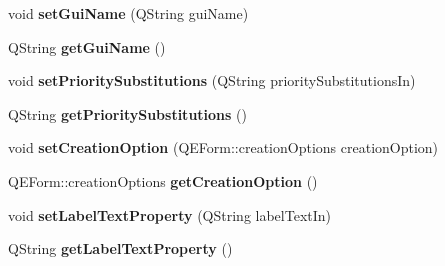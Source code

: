 \begin{DoxyCompactItemize}
\item 
\hypertarget{classQEGenericButton_a5d5e32f2ab10703aa31cd321e90c39f0}{
void {\bfseries setGuiName} (QString guiName)}
\label{classQEGenericButton_a5d5e32f2ab10703aa31cd321e90c39f0}

\item 
\hypertarget{classQEGenericButton_a403f79f9e7159277263e48b73f7cca7a}{
QString {\bfseries getGuiName} ()}
\label{classQEGenericButton_a403f79f9e7159277263e48b73f7cca7a}

\item 
\hypertarget{classQEGenericButton_a30e30457e63dc866da487258064e02c1}{
void {\bfseries setPrioritySubstitutions} (QString prioritySubstitutionsIn)}
\label{classQEGenericButton_a30e30457e63dc866da487258064e02c1}

\item 
\hypertarget{classQEGenericButton_adac082d484c513232c82274947e8b623}{
QString {\bfseries getPrioritySubstitutions} ()}
\label{classQEGenericButton_adac082d484c513232c82274947e8b623}

\item 
\hypertarget{classQEGenericButton_a3640442dd5a6f07b3cac78a16d92079c}{
void {\bfseries setCreationOption} (QEForm::creationOptions creationOption)}
\label{classQEGenericButton_a3640442dd5a6f07b3cac78a16d92079c}

\item 
\hypertarget{classQEGenericButton_a374933dfd5d97ce5d8c2e7c6509bdb8c}{
QEForm::creationOptions {\bfseries getCreationOption} ()}
\label{classQEGenericButton_a374933dfd5d97ce5d8c2e7c6509bdb8c}

\item 
\hypertarget{classQEGenericButton_ad78bb7a4c7dce75bb021c4e6eaaedf67}{
void {\bfseries setLabelTextProperty} (QString labelTextIn)}
\label{classQEGenericButton_ad78bb7a4c7dce75bb021c4e6eaaedf67}

\item 
\hypertarget{classQEGenericButton_a11f1483f1397d6547d1ed1824e42f46a}{
QString {\bfseries getLabelTextProperty} ()}
\label{classQEGenericButton_a11f1483f1397d6547d1ed1824e42f46a}

\end{DoxyCompactItemize}
